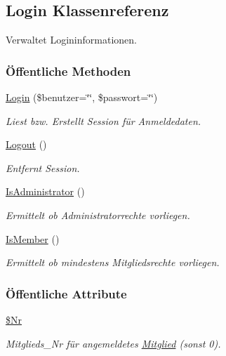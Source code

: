 \hypertarget{classLogin}{
\subsection{Login Klassenreferenz}
\label{classLogin}
}
Verwaltet Logininformationen.  


\subsubsection*{\"{O}ffentliche Methoden}
\begin{CompactItemize}
\item 
\hyperlink{classLogin_5d83c782459f6389f350666eb102974d}{Login} (\$benutzer=\char`\"{}\char`\"{}, \$passwort=\char`\"{}\char`\"{})
\begin{CompactList}\small\item\em Liest bzw. Erstellt Session für Anmeldedaten. \item\end{CompactList}\item 
\hyperlink{classLogin_4cbf74bd382f34e863aec07c3eda0400}{Logout} ()
\begin{CompactList}\small\item\em Entfernt Session. \item\end{CompactList}\item 
\hyperlink{classLogin_6c120224aa6719f58c6ccd08acc28758}{Is\-Administrator} ()
\begin{CompactList}\small\item\em Ermittelt ob Administratorrechte vorliegen. \item\end{CompactList}\item 
\hyperlink{classLogin_70d2747b0aa454f4203a789afea25318}{Is\-Member} ()
\begin{CompactList}\small\item\em Ermittelt ob mindestens Mitgliedsrechte vorliegen. \item\end{CompactList}\end{CompactItemize}
\subsubsection*{\"{O}ffentliche Attribute}
\begin{CompactItemize}
\item 
\hyperlink{classLogin_227dede2a7c9c25b1e103b32de62d4df}{\$Nr}
\begin{CompactList}\small\item\em Mitglieds\_\-Nr für angemeldetes \hyperlink{classMitglied}{Mitglied} (sonst 0). \item\end{CompactList}\end{CompactItemize}



